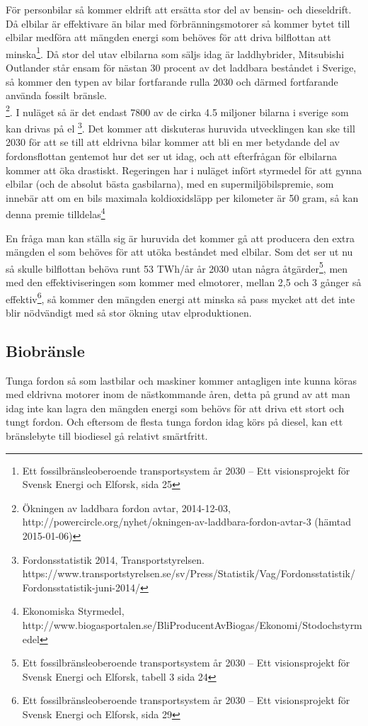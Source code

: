 \documentclass[a4paper,11pt,fleqn, titlepage]{article}
\begin{document}
För personbilar så kommer eldrift att ersätta stor del av bensin- och
dieseldrift. Då elbilar är effektivare än bilar med förbränningsmotorer så
kommer bytet till elbilar medföra att mängden energi som behöves för att
driva bilflottan att minska\footnote{Ett fossilbränsleoberoende
transportsystem år 2030 – Ett visionsprojekt för Svensk Energi och Elforsk,
sida 25}. Då stor del utav elbilarna som säljs idag är laddhybrider,
Mitsubishi Outlander står ensam för nästan 30 procent av det laddbara
beståndet i Sverige, så kommer den typen av bilar fortfarande rulla 2030
och därmed fortfarande använda fossilt bränsle. \\
\footnote{Ökningen av laddbara fordon avtar,
 2014-12-03, \\
http://powercircle.org/nyhet/okningen-av-laddbara-fordon-avtar-3 (hämtad
2015-01-06)}.
I nuläget så är det endast
7800 av de cirka 4.5 miljoner bilarna i sverige som kan drivas på el
\footnote {Fordonsstatistik 2014, Transportstyrelsen. \\
https://www.transportstyrelsen.se/sv/Press/Statistik/Vag/Fordonsstatistik/
Fordonsstatistik-juni-2014/ }. Det kommer att diskuteras huruvida 
utvecklingen kan ske till 2030 för att se till att eldrivna bilar kommer
att bli en mer betydande del av fordonsflottan gentemot hur det ser ut
idag, och att efterfrågan för elbilarna kommer att öka drastiskt.
Regeringen har i nuläget infört styrmedel för att gynna elbilar
(och de absolut bästa gasbilarna), med en supermiljöbilspremie, som innebär
att om en bils maximala koldioxidsläpp per kilometer är 50 gram, så kan denna
premie tilldelas\footnote{Ekonomiska Styrmedel, \\
http://www.biogasportalen.se/BliProducentAvBiogas/Ekonomi/Stodochstyrmedel}

En fråga man kan ställa sig är huruvida det kommer gå att producera den
extra mängden el som behöves för att utöka beståndet med elbilar. Som det
ser ut nu så skulle bilflottan behöva runt 53 TWh/år år 2030 utan några
åtgärder\footnote{Ett fossilbränsleoberoende transportsystem år 2030 – Ett
visionsprojekt för Svensk Energi och Elforsk, tabell 3 sida 24}, men med
den effektiviseringen som kommer med elmotorer, mellan 2,5 och 3 gånger så
effektiv\footnote{Ett fossilbränsleoberoende transportsystem år 2030 – Ett
visionsprojekt för Svensk Energi och Elforsk, sida 29}, så kommer den
mängden energi att minska så pass mycket att det inte blir nödvändigt med
så stor ökning utav elproduktionen.

\subsection{Biobränsle}
Tunga fordon så som lastbilar och maskiner kommer antagligen inte kunna
köras med eldrivna motorer inom de nästkommande åren, detta på grund av att
man idag inte kan lagra den mängden energi som behövs för att driva ett
stort och tungt fordon. Och eftersom de flesta tunga fordon idag körs på
diesel, kan ett bränslebyte till biodiesel gå relativt smärtfritt.
\end{document}
